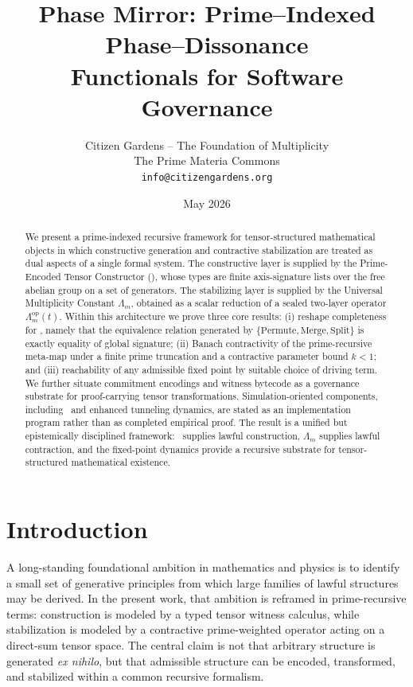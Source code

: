 \documentclass[11pt,a4paper]{article}
\title{\textbf{Phase Mirror: Prime–Indexed Phase--Dissonance}\\
Functionals for Software Governance}
\author{Citizen Gardens -- The Foundation of Multiplicity\\
The Prime Materia Commons\\
\texttt{info@citizengardens.org}}
\date{May 2026}
\newcommand{\op}{\mathrm{op}}
\newcommand{\PETC}{\mathrm{PETC}}
\newcommand{\ZRSD}{\mathrm{ZRSD}}
\begin{document}
\maketitle

\begin{abstract}
We present a prime-indexed recursive framework for tensor-structured mathematical objects in which constructive generation and contractive stabilization are treated as dual aspects of a single formal system. The constructive layer is supplied by the Prime-Encoded Tensor Constructor (\PETC), whose types are finite axis-signature lists over the free abelian group on a set of generators. The stabilizing layer is supplied by the Universal Multiplicity Constant \(\Lambda_m\), obtained as a scalar reduction of a sealed two-layer operator \(\Lambda_m^{\op}(t)\). Within this architecture we prove three core results: (i) reshape completeness for \PETC, namely that the equivalence relation generated by \(\{\mathrm{Permute},\mathrm{Merge},\mathrm{Split}\}\) is exactly equality of global signature; (ii) Banach contractivity of the prime-recursive meta-map under a finite prime truncation and a contractive parameter bound \(k<1\); and (iii) reachability of any admissible fixed point by suitable choice of driving term. We further situate commitment encodings and witness bytecode as a governance substrate for proof-carrying tensor transformations. Simulation-oriented components, including \ZRSD\ and enhanced tunneling dynamics, are stated as an implementation program rather than as completed empirical proof. The result is a unified but epistemically disciplined framework: \PETC\ supplies lawful construction, \(\Lambda_m\) supplies lawful contraction, and the fixed-point dynamics provide a recursive substrate for tensor-structured mathematical existence.
\end{abstract}
\newpage    
\tableofcontents
\newpage
\section{Introduction}

A long-standing foundational ambition in mathematics and physics is to identify a small set of generative principles from which large families of lawful structures may be derived. In the present work, that ambition is reframed in prime-recursive terms: construction is modeled by a typed tensor witness calculus, while stabilization is modeled by a contractive prime-weighted operator acting on a direct-sum tensor space. The central claim is not that arbitrary structure is generated \emph{ex nihilo}, but that admissible structure can be encoded, transformed, and stabilized within a common recursive formalism.
\end{document}
